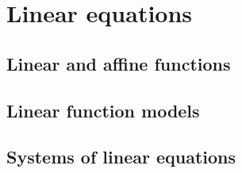 \section{Linear equations}
\subsection{Linear and affine functions}
\subsection{Linear function models}
\subsection{Systems of linear equations}